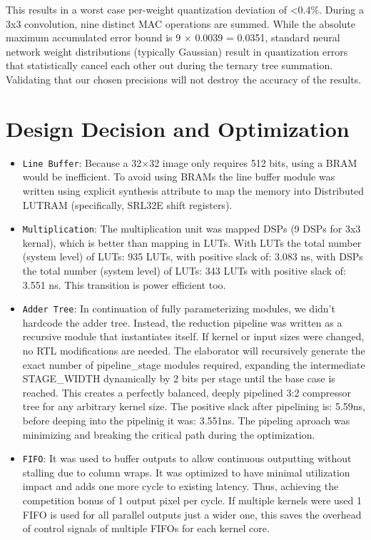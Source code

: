 \documentclass[12pt, a4paper]{article}
\begin{document}
This results in a worst case per-weight quantization deviation of <0.4\%. During a 3x3 convolution, nine distinct MAC operations are summed. While the absolute maximum accumulated error bound is 9 × 0.0039 = 0.0351, standard neural network weight distributions (typically Gaussian) result in quantization errors that statistically cancel each other out during the ternary tree summation. Validating that our chosen precisions will not destroy the accuracy of the results.
\newpage

\section{Design Decision and Optimization}
    \begin{itemize}
    \item \textcolor[HTML]{A31515}{\texttt{Line Buffer}}: Because a 32×32 image only requires 512 bits, using a BRAM would be inefficient. To avoid using BRAMs the line buffer module was written using explicit synthesis attribute to map the memory into Distributed LUTRAM (specifically, SRL32E shift registers).

    \item \textcolor[HTML]{A31515}{\texttt{Multiplication}}: The multiplication unit was mapped DSPs (9 DSPs for 3x3 kernal), which is better than mapping in LUTs. With LUTs the total number (system level) of LUTs: 935 LUTs, with positive slack of: 3.083 ns, with DSPs the total number (system level) of LUTs: 343 LUTs with positive slack of: 3.551 ns. This transition is power efficient too.

    \item \textcolor[HTML]{A31515}{\texttt{Adder Tree}}: In continuation of fully parameterizing modules, we didn’t hardcode the adder tree. Instead, the reduction pipeline was written as a recursive module that instantiates itself. If kernel or input sizes were changed, no RTL modifications are needed. The elaborator will recursively generate the exact number of pipeline\_stage modules required, expanding the intermediate STAGE\_WIDTH dynamically by 2 bits per stage until the base case is reached. This creates a perfectly balanced, deeply pipelined 3:2 compressor tree for any arbitrary kernel size. The positive slack after pipelining is: 5.59ns, before deeping into the pipelinig it was: 3.551ns. The pipeling aproach was minimizing and breaking the critical path during the optimization.

    \item \textcolor[HTML]{A31515}{\texttt{FIFO}}: It was used to buffer outputs to allow continuous outputting without stalling due to column wraps. It was optimized to have minimal utilization impact and adds one more cycle to existing latency. Thus, achieving the competition bonus of 1 output pixel per cycle. If multiple kernels were used 1 FIFO is used for all parallel outputs just a wider one, this saves the overhead of control signals of multiple FIFOs for each kernel core.


\end{itemize}
\end{document}
